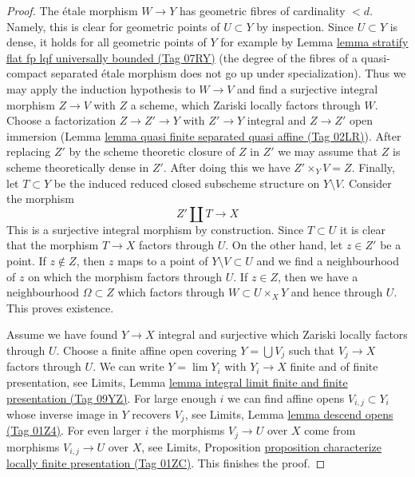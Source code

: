 \documentclass{amsart}
\theoremstyle{plain}
\theoremstyle{definition}
\theoremstyle{remark}
\numberwithin{equation}{subsection}
\def\lim{\mathop{\mathrm{lim}}\nolimits}
\begin{document}
\begin{proof}
\medskip\noindent
The \'etale morphism $W \to Y$ has geometric fibres of cardinality $< d$.
Namely, this is clear for geometric points of $U \subset Y$ by inspection.
Since $U \subset Y$ is dense, it holds for all geometric points of $Y$
for example by Lemma
\href{https://stacks.math.columbia.edu/tag/07RY}{lemma stratify flat fp lqf universally bounded (Tag 07RY)}
(the degree of the fibres of a quasi-compact separated \'etale morphism
does not go up under specialization). Thus we may apply the induction
hypothesis to $W \to V$ and find a surjective integral morphism
$Z \to V$ with $Z$ a scheme, which Zariski locally factors through $W$.
Choose a factorization $Z \to Z' \to Y$ with $Z' \to Y$ integral and
$Z \to Z'$ open immersion
(Lemma \href{https://stacks.math.columbia.edu/tag/02LR}{lemma quasi finite separated quasi affine (Tag 02LR)}).
After replacing $Z'$ by the scheme theoretic closure of $Z$ in $Z'$
we may assume that $Z$ is scheme theoretically dense in $Z'$.
After doing this we have $Z' \times_Y V = Z$. Finally,
let $T \subset Y$ be the induced reduced closed subscheme structure
on $Y \setminus V$. Consider the morphism
$$
Z' \amalg T \longrightarrow X
$$
This is a surjective integral morphism by construction.
Since $T \subset U$ it is clear that the morphism $T \to X$
factors through $U$. On the other hand, let $z \in Z'$
be a point. If $z \not \in Z$, then $z$ maps to a point of
$Y \setminus V \subset U$ and we find a neighbourhood of $z$
on which the morphism factors through $U$.
If $z \in Z$, then we have a neighbourhood $\Omega \subset Z$
which factors through $W \subset U \times_X Y$ and hence through $U$.
This proves existence.

\medskip\noindent
Assume we have found $Y \to X$ integral and surjective which Zariski
locally factors through $U$. Choose a finite affine open covering
$Y = \bigcup V_j$ such that $V_j \to X$ factors through $U$. We can
write $Y = \lim Y_i$ with $Y_i \to X$ finite and of finite
presentation, see Limits, Lemma
\href{https://stacks.math.columbia.edu/tag/09YZ}{lemma integral limit finite and finite presentation (Tag 09YZ)}.
For large enough $i$ we can find affine opens $V_{i, j} \subset Y_i$
whose inverse image in $Y$ recovers $V_j$, see
Limits, Lemma \href{https://stacks.math.columbia.edu/tag/01Z4}{lemma descend opens (Tag 01Z4)}.
For even larger $i$ the morphisms $V_j \to U$ over $X$ come
from morphisms $V_{i, j} \to U$ over $X$, see
Limits, Proposition
\href{https://stacks.math.columbia.edu/tag/01ZC}{proposition characterize locally finite presentation (Tag 01ZC)}.
This finishes the proof.
\end{proof}
\end{document}
